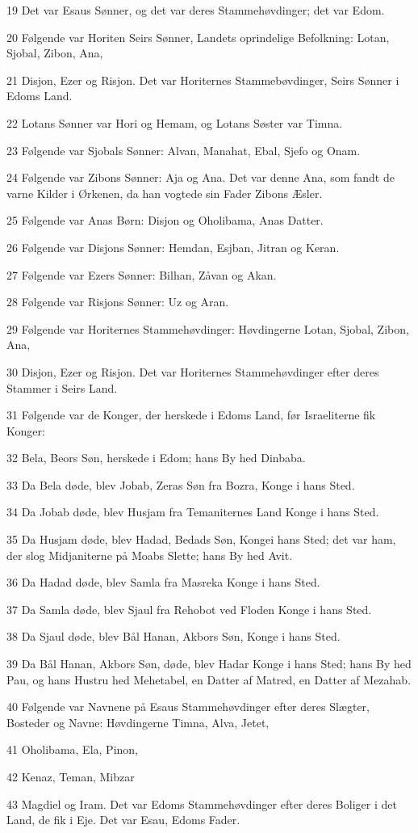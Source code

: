 \par 19 Det var Esaus Sønner, og det var deres Stammehøvdinger; det var Edom.
\par 20 Følgende var Horiten Seirs Sønner, Landets oprindelige Befolkning: Lotan, Sjobal, Zibon, Ana,
\par 21 Disjon, Ezer og Risjon. Det var Horiternes Stammebøvdinger, Seirs Sønner i Edoms Land.
\par 22 Lotans Sønner var Hori og Hemam, og Lotans Søster var Timna.
\par 23 Følgende var Sjobals Sønner: Alvan, Manahat, Ebal, Sjefo og Onam.
\par 24 Følgende var Zibons Sønner: Aja og Ana. Det var denne Ana, som fandt de varne Kilder i Ørkenen, da han vogtede sin Fader Zibons Æsler.
\par 25 Følgende var Anas Børn: Disjon og Oholibama, Anas Datter.
\par 26 Følgende var Disjons Sønner: Hemdan, Esjban, Jitran og Keran.
\par 27 Følgende var Ezers Sønner: Bilhan, Zåvan og Akan.
\par 28 Følgende var Risjons Sønner: Uz og Aran.
\par 29 Følgende var Horiternes Stammehøvdinger: Høvdingerne Lotan, Sjobal, Zibon, Ana,
\par 30 Disjon, Ezer og Risjon. Det var Horiternes Stammehøvdinger efter deres Stammer i Seirs Land.
\par 31 Følgende var de Konger, der herskede i Edoms Land, før Israeliterne fik Konger:
\par 32 Bela, Beors Søn, herskede i Edom; hans By hed Dinbaba.
\par 33 Da Bela døde, blev Jobab, Zeras Søn fra Bozra, Konge i hans Sted.
\par 34 Da Jobab døde, blev Husjam fra Temaniternes Land Konge i hans Sted.
\par 35 Da Husjam døde, blev Hadad, Bedads Søn, Kongei hans Sted; det var ham, der slog Midjaniterne på Moabs Slette; hans By hed Avit.
\par 36 Da Hadad døde, blev Samla fra Masreka Konge i hans Sted.
\par 37 Da Samla døde, blev Sjaul fra Rehobot ved Floden Konge i hans Sted.
\par 38 Da Sjaul døde, blev Bål Hanan, Akbors Søn, Konge i hans Sted.
\par 39 Da Bål Hanan, Akbors Søn, døde, blev Hadar Konge i hans Sted; hans By hed Pau, og hans Hustru hed Mehetabel, en Datter af Matred, en Datter af Mezahab.
\par 40 Følgende var Navnene på Esaus Stammehøvdinger efter deres Slægter, Bosteder og Navne: Høvdingerne Timna, Alva, Jetet,
\par 41 Oholibama, Ela, Pinon,
\par 42 Kenaz, Teman, Mibzar
\par 43 Magdiel og Iram. Det var Edoms Stammehøvdinger efter deres Boliger i det Land, de fik i Eje. Det var Esau, Edoms Fader.

